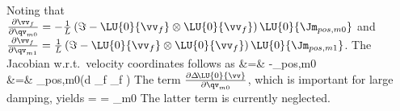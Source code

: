     Noting that $\frac{\partial \vv_{f} }{\partial \qv_{m0}} = 
    -\frac{1}{L}\left(\Im - \LU{0}{\vv_{f}} \otimes \LU{0}{\vv_{f}} \right) \LU{0}{\Jm_{pos,m0}}$ and 
    $\frac{\partial \vv_{f} }{\partial \qv_{m1}} = 
    \frac{1}{L}\left(\Im - \LU{0}{\vv_{f}} \otimes \LU{0}{\vv_{f}} \right) \LU{0}{\Jm_{pos,m1}}$.
%
    The Jacobian w.r.t.\ velocity coordinates follows as
    \bea
      &=& -\Jm_{pos,m0}\tp {}
      \nonumber \\
      &=& \Jm_{pos,m0}\tp \left(d \vv_{f} \otimes \vv_{f} \right)  
    \eea
    The term $\frac{\partial \Delta\! \LU{0}{\vv}}{\partial \qv_{m0}}$, which is important for large damping, yields
    \be
       = 
      =
       \dot \qv_{m0}
    \ee
    The latter term is currently neglected.
    
